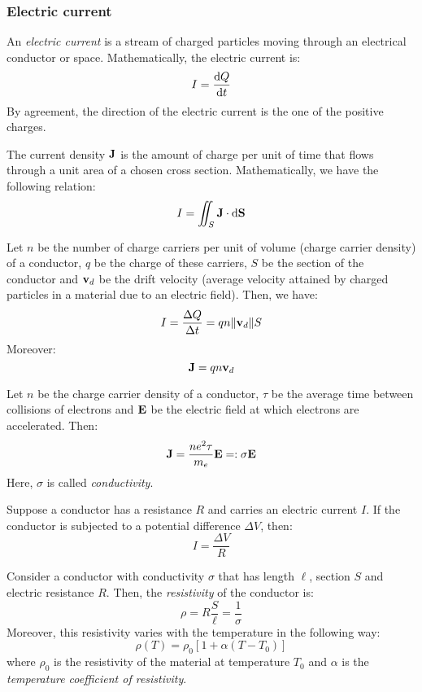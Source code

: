 \documentclass[../../../main_physics.tex]{subfiles}
\begin{document}
\begin{multicols}{2}
  \subsubsection{Electric current}
  \begin{definition}
    An \emph{electric current} is a stream of charged particles moving through an electrical conductor or space. Mathematically, the electric current is: $$I=\dv{Q}{t}$$
    By agreement, the direction of the electric current is the one of the positive charges.
  \end{definition}
  \begin{definition}
    The current density $\boldsymbol{\mathrm{J}}$ is the amount of charge per unit of time that flows through a unit area of a chosen cross section. Mathematically, we have the following relation: $$I=\iint_S\boldsymbol{\mathrm{J}}\cdot\dd{\boldsymbol{\mathrm{S}}}$$
  \end{definition}
  \begin{proposition}
    Let $n$ be the number of charge carriers per unit of volume (charge carrier density) of a conductor, $q$ be the charge of these carriers, $S$ be the section of the conductor and $\boldsymbol{\mathrm{v}}_d$ be the drift velocity (average velocity attained by charged particles in a material due to an electric field). Then, we have:
    $$I=\frac{\Delta Q}{\Delta t}=q n \|\boldsymbol{\mathrm{v}}_d\|S$$
    Moreover: $$\boldsymbol{\mathrm{J}}=q n\boldsymbol{\mathrm{v}}_d$$
  \end{proposition}
  \begin{law}
    Let $n$ be the charge carrier density of a conductor, $\tau$ be the average time between collisions of electrons and $\boldsymbol{\mathrm{E}}$ be the electric field at which electrons are accelerated. Then: $$\boldsymbol{\mathrm{J}}=\frac{ne^2\tau}{m_e}\boldsymbol{\mathrm{E}}=:\sigma\boldsymbol{\mathrm{E}}$$
    Here, $\sigma$ is called \emph{conductivity}.
  \end{law}
  \begin{law}
    Suppose a conductor has a resistance $R$ and carries an electric current $I$. If the conductor is subjected to a potential difference $\Delta V$, then: $$I=\frac{\Delta V}{R}$$
  \end{law}
  \begin{definition}[Resistivity]
    Consider a conductor with conductivity $\sigma$ that has length $\ell$, section $S$ and electric resistance $R$. Then, the \emph{resistivity} of the conductor is: $$\rho=R\frac{S}{\ell}=\frac{1}{\sigma}$$
    Moreover, this resistivity varies with the temperature in the following way: $$\rho(T)=\rho_0\left[1+\alpha(T-T_0)\right]$$
    where $\rho_0$ is the resistivity of the material at temperature $T_0$ and $\alpha$ is the \emph{temperature coefficient of resistivity}.

\end{definition}
\end{multicols}
\end{document}
